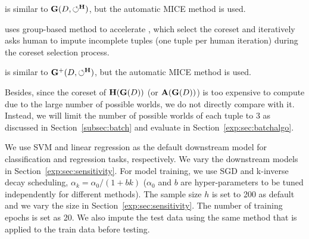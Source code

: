  is similar to $\mathbf{G}(D,\circlearrowleft^\mathbf{H})$, but the automatic  MICE  method is used.

 uses group-based method to accelerate \ours, which select the coreset and iteratively asks human to impute incomplete tuples (one tuple per human iteration) during the coreset selection process.

 is similar to $\mathbf{G}^+(D,\circlearrowleft^\mathbf{H})$, but the automatic  MICE  method is used.


Besides, since the coreset of $\mathbf{H}(\mathbf{G}(D))$ (or $\mathbf{A}(\mathbf{G}(D))$) is too expensive to compute due to the large number of possible worlds, we do not directly compare with it. Instead, we will limit the number of possible worlds of each tuple to 3 as discussed in Section~\ref{subsec:batch} and evaluate in Section~\ref{exp:sec:batchalgo}.



 







We use SVM and linear regression as the default downstream model for classification and regression tasks, respectively. We vary the downstream models in Section~\ref{exp:sec:sensitivity}. For model training, we use SGD and k-inverse decay  scheduling, \ie $\alpha_k = \alpha_0 / (1+bk)$ ($\alpha_0$ and $b$ are hyper-parameters to be tuned independently for different methods).  The sample size $h$ is set to 200 as default and we vary the  size in Section~\ref{exp:sec:sensitivity}. The number of training epochs is set as 20. %
We also impute the test data using the same method that is applied to the train data before testing.
